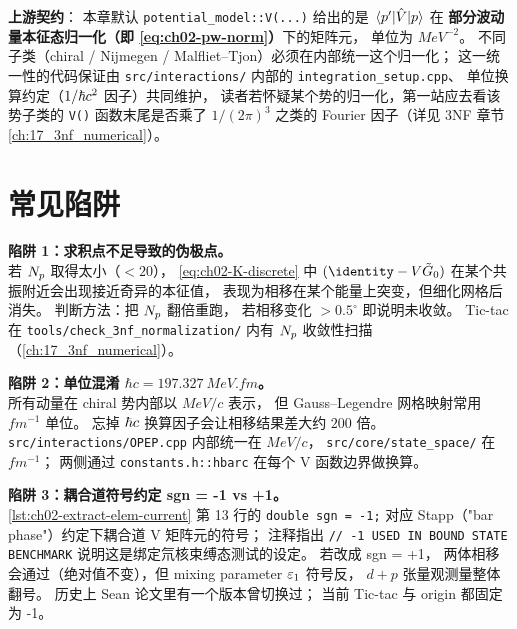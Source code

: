 \textbf{上游契约}：
本章默认 \texttt{potential\_model::V(...)} 给出的是 $\matrixel{p'}{\Vop}{p}$ 在
\textbf{部分波动量本征态归一化（即 \cref{eq:ch02-pw-norm}）}下的矩阵元，
单位为 $\si{MeV^{-2}}$。
不同子类（chiral / Nijmegen / Malfliet--Tjon）必须在内部统一这个归一化；
这一统一性的代码保证由 \texttt{src/interactions/} 内部的
\texttt{integration\_setup.cpp}、
单位换算约定（$1 / \hbar c^2$ 因子）共同维护，
读者若怀疑某个势的归一化，第一站应去看该势子类的 \texttt{V()} 函数末尾是否乘了 $1/(2\pi)^3$ 之类的 Fourier 因子（详见 3NF 章节 \cref{ch:17_3nf_numerical}）。

\section{常见陷阱}
\label{sec:ch02-pitfalls}

\begin{pitfallbox}
\textbf{陷阱 1：求积点不足导致的伪极点。}\\
若 $N_p$ 取得太小（$< 20$），
\cref{eq:ch02-K-discrete} 中
$(\identity - V \tilde{G}_0)$ 在某个共振附近会出现接近奇异的本征值，
表现为相移在某个能量上突变，但细化网格后消失。
判断方法：把 $N_p$ 翻倍重跑，
若相移变化 $> 0.5^\circ$ 即说明未收敛。
Tic-tac 在 \texttt{tools/check\_3nf\_normalization/} 内有
$N_p$ 收敛性扫描（\cref{ch:17_3nf_numerical}）。
\end{pitfallbox}

\begin{pitfallbox}
\textbf{陷阱 2：单位混淆 $\hbar c = \SI{197.327}{MeV.fm}$。}\\
所有动量在 chiral 势内部以 $\si{MeV/c}$ 表示，
但 Gauss--Legendre 网格映射常用 $\si{fm^{-1}}$ 单位。
忘掉 $\hbar c$ 换算因子会让相移结果差大约 $200$ 倍。
\texttt{src/interactions/OPEP.cpp} 内部统一在 $\si{MeV/c}$，
\texttt{src/core/state\_space/} 在 $\si{fm^{-1}}$；
两侧通过 \texttt{constants.h::hbarc} 在每个 V 函数边界做换算。
\end{pitfallbox}

\begin{pitfallbox}
\textbf{陷阱 3：耦合道符号约定 sgn = -1 vs +1。}\\
\cref{lst:ch02-extract-elem-current} 第 13 行的
\texttt{double sgn = -1;}
对应 Stapp（"bar phase"）约定下耦合道 V 矩阵元的符号；
注释指出
\texttt{// -1 USED IN BOUND STATE BENCHMARK}
说明这是绑定氘核束缚态测试的设定。
若改成 sgn = +1，
两体相移会通过（绝对值不变），但 mixing parameter $\varepsilon_1$ 符号反，
$d+p$ 张量观测量整体翻号。
历史上 Sean 论文里有一个版本曾切换过；
当前 Tic-tac 与 origin 都固定为 -1。
\end{pitfallbox}

